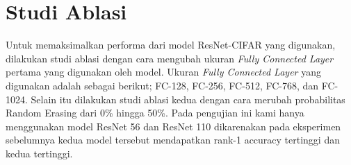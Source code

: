 \section{Studi Ablasi}
\vspace{1ex}
Untuk memaksimalkan performa dari model ResNet-CIFAR yang digunakan, dilakukan studi ablasi dengan cara mengubah ukuran \textit{Fully Connected Layer} pertama yang digunakan oleh model. Ukuran \textit{Fully Connected Layer} yang digunakan adalah sebagai berikut; FC-128, FC-256, FC-512, FC-768, dan FC-1024. Selain itu dilakukan studi ablasi kedua dengan cara merubah probabilitas Random Erasing dari 0\% hingga 50\%. Pada pengujian ini kami hanya menggunakan model ResNet 56 dan ResNet 110 dikarenakan pada eksperimen sebelumnya kedua model tersebut mendapatkan rank-1 accuracy tertinggi dan kedua tertinggi.

\pagebreak
